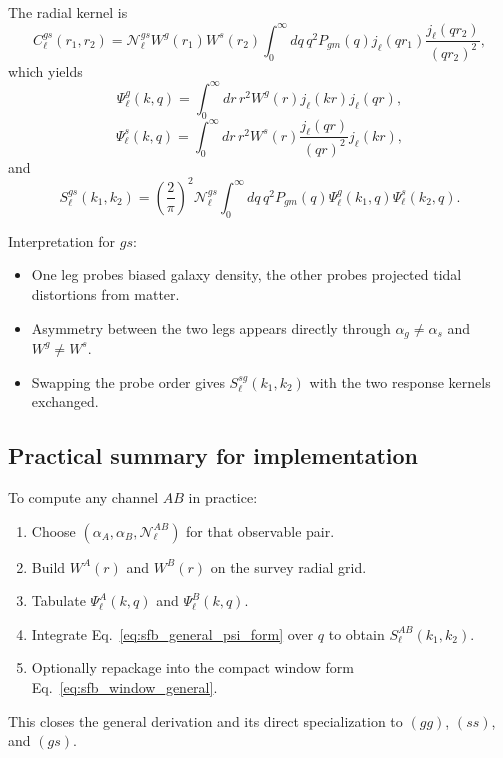 The radial kernel is
\begin{equation}
C_\ell^{gs}(r_1,r_2)
=\mathcal N_\ell^{gs}W^g(r_1)W^s(r_2)
\int_0^{\infty}dq\,q^2P_{gm}(q)
j_\ell(qr_1)\frac{j_\ell(qr_2)}{(qr_2)^2},
\end{equation}
which yields
\begin{equation}
\Psi_\ell^g(k,q)=\int_0^{\infty}dr\,r^2W^g(r)j_\ell(kr)j_\ell(qr),
\end{equation}
\begin{equation}
\Psi_\ell^s(k,q)=\int_0^{\infty}dr\,r^2W^s(r)\frac{j_\ell(qr)}{(qr)^2}j_\ell(kr),
\end{equation}
and
\begin{equation}
S_\ell^{gs}(k_1,k_2)
=\left(\frac{2}{\pi}\right)^2\mathcal N_\ell^{gs}
\int_0^{\infty}dq\,q^2P_{gm}(q)
\Psi_\ell^g(k_1,q)\Psi_\ell^s(k_2,q).
\label{eq:sfb_gs_final}
\end{equation}

Interpretation for $gs$:
\begin{itemize}
\item One leg probes biased galaxy density, the other probes projected tidal
distortions from matter.
\item Asymmetry between the two legs appears directly through
$\alpha_g\neq\alpha_s$ and $W^g\neq W^s$.
\item Swapping the probe order gives $S_\ell^{sg}(k_1,k_2)$ with the two response
kernels exchanged.
\end{itemize}

\subsection{Practical summary for implementation}

To compute any channel $AB$ in practice:
\begin{enumerate}
\item Choose $(\alpha_A,\alpha_B,\mathcal N_\ell^{AB})$ for that observable pair.
\item Build $W^A(r)$ and $W^B(r)$ on the survey radial grid.
\item Tabulate $\Psi_\ell^A(k,q)$ and $\Psi_\ell^B(k,q)$.
\item Integrate Eq.~\eqref{eq:sfb_general_psi_form} over $q$ to obtain
$S_\ell^{AB}(k_1,k_2)$.
\item Optionally repackage into the compact window form
Eq.~\eqref{eq:sfb_window_general}.
\end{enumerate}

This closes the general derivation and its direct specialization to
$(gg)$, $(ss)$, and $(gs)$.
